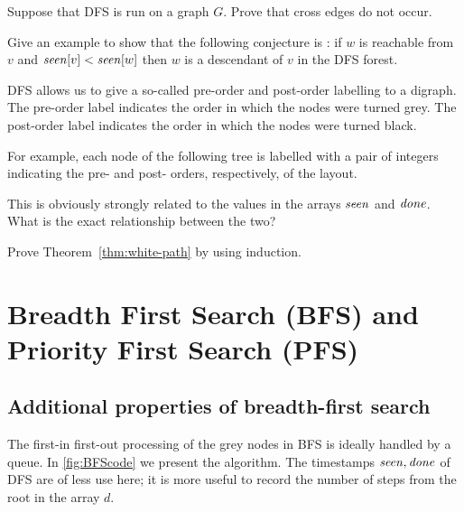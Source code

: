 \begin{Exercise}
\label{ex:DFS-graph-no-cross}
Suppose that DFS is run on a graph $G$. Prove that cross edges do not occur.
\end{Exercise}

\begin{Exercise}
\label{ex:DFS-false-conj}
Give an example to show that the following conjecture is : if $w$ is reachable from $v$ and $\operatorname{\text{\textit{seen}}}[v] < \operatorname{\text{\textit{seen}}}[w]$ then $w$ is
a descendant of $v$ in the DFS forest.
\end{Exercise}

\begin{Exercise}
\label{ex:DFS-prepostorder}
DFS allows us to give a so-called pre-order and post-order labelling to
a digraph. The pre-order label indicates the order in which the nodes
were turned grey. The post-order label indicates the order in which the
nodes were turned black.

For example, each node of the following tree is labelled with a pair of
integers indicating the pre- and post- orders, respectively, of the
layout.

\smallskip


This is obviously strongly related to the values in the arrays $\operatorname{\text{\textit{seen}}}$ and 
$\operatorname{\text{\textit{done}}}$. What is the exact relationship between the two?
\end{Exercise}

\begin{Exercise}\label{ex:white-path}
Prove Theorem~\ref{thm:white-path} by using induction.
\end{Exercise}


\chapter{Breadth First Search (BFS) and Priority First Search (PFS)}

\section{Additional properties of breadth-first search}
\label{sec:bfs}

The first-in first-out processing of the grey nodes in BFS is ideally
handled by a queue. In \cref{fig:BFScode} we present the algorithm.
The timestamps $\operatorname{\text{\textit{seen}}}, \operatorname{\text{\textit{done}}}$ of DFS are of less use here;
it is more useful to record the number of steps from the root in the
array $d$.


